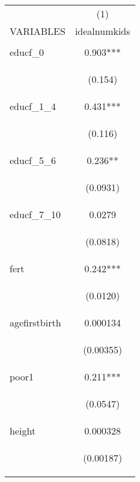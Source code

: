 \documentclass[]{article}
\begin{document}
\begin{center}
\begin{tabular}{lc} \hline
 & (1) \\
VARIABLES & idealnumkids \\ \hline
\vspace{4pt} & \begin{footnotesize}\end{footnotesize} \\
educf\_0 & 0.903*** \\
\vspace{4pt} & \begin{footnotesize}(0.154)\end{footnotesize} \\
educf\_1\_4 & 0.431*** \\
\vspace{4pt} & \begin{footnotesize}(0.116)\end{footnotesize} \\
educf\_5\_6 & 0.236** \\
\vspace{4pt} & \begin{footnotesize}(0.0931)\end{footnotesize} \\
educf\_7\_10 & 0.0279 \\
\vspace{4pt} & \begin{footnotesize}(0.0818)\end{footnotesize} \\
fert & 0.242*** \\
\vspace{4pt} & \begin{footnotesize}(0.0120)\end{footnotesize} \\
agefirstbirth & 0.000134 \\
\vspace{4pt} & \begin{footnotesize}(0.00355)\end{footnotesize} \\
poor1 & 0.211*** \\
\vspace{4pt} & \begin{footnotesize}(0.0547)\end{footnotesize} \\
height & 0.000328 \\
\vspace{4pt} & \begin{footnotesize}(0.00187)\end{footnotesize} \\

\end{tabular}
\end{center}
\end{document}
